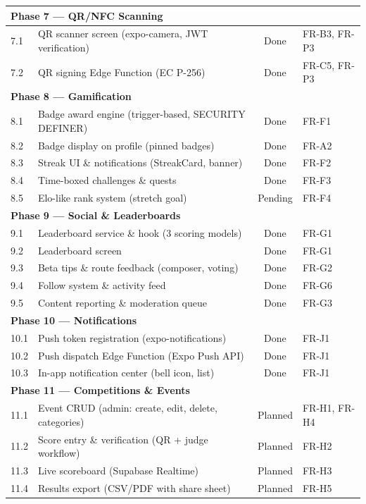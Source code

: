 \documentclass[12pt,a4paper]{report}
\renewcommand\_{\textunderscore\hspace{0pt}}
\begin{document}
\begin{longtable}{l >{\raggedright\arraybackslash}p{7.5cm} c >{\raggedright\arraybackslash}p{3cm}}
\hline
\multicolumn{4}{l}{\textbf{Phase 7 --- QR/NFC Scanning}} \\
\hline
7.1 & QR scanner screen (expo-camera, JWT verification) & Done & FR-B3, FR-P3 \\
7.2 & QR signing Edge Function (EC P-256) & Done & FR-C5, FR-P3 \\

\hline
\multicolumn{4}{l}{\textbf{Phase 8 --- Gamification}} \\
\hline
8.1 & Badge award engine (trigger-based, SECURITY DEFINER) & Done & FR-F1 \\
8.2 & Badge display on profile (pinned badges) & Done & FR-A2 \\
8.3 & Streak UI \& notifications (StreakCard, banner) & Done & FR-F2 \\
8.4 & Time-boxed challenges \& quests & Done & FR-F3 \\
8.5 & Elo-like rank system (stretch goal) & Pending & FR-F4 \\

\hline
\multicolumn{4}{l}{\textbf{Phase 9 --- Social \& Leaderboards}} \\
\hline
9.1 & Leaderboard service \& hook (3 scoring models) & Done & FR-G1 \\
9.2 & Leaderboard screen & Done & FR-G1 \\
9.3 & Beta tips \& route feedback (composer, voting) & Done & FR-G2 \\
9.4 & Follow system \& activity feed & Done & FR-G6 \\
9.5 & Content reporting \& moderation queue & Done & FR-G3 \\

\hline
\multicolumn{4}{l}{\textbf{Phase 10 --- Notifications}} \\
\hline
10.1 & Push token registration (expo-notifications) & Done & FR-J1 \\
10.2 & Push dispatch Edge Function (Expo Push API) & Done & FR-J1 \\
10.3 & In-app notification center (bell icon, list) & Done & FR-J1 \\

\hline
\multicolumn{4}{l}{\textbf{Phase 11 --- Competitions \& Events}} \\
\hline
11.1 & Event CRUD (admin: create, edit, delete, categories) & Planned & FR-H1, FR-H4 \\
11.2 & Score entry \& verification (QR + judge workflow) & Planned & FR-H2 \\
11.3 & Live scoreboard (Supabase Realtime) & Planned & FR-H3 \\
11.4 & Results export (CSV/PDF with share sheet) & Planned & FR-H5 \\


\end{longtable}
\end{document}
